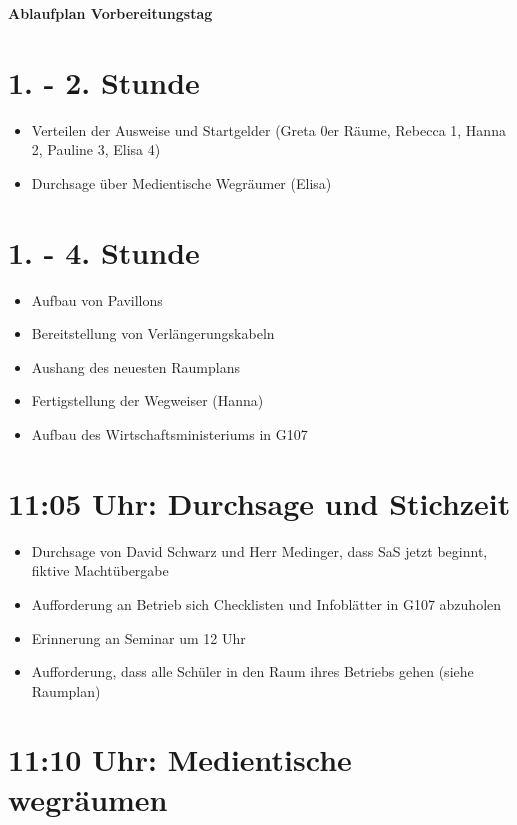 \documentclass[12pt]{article}
\begin{document}
\textbf{\LARGE{Ablaufplan Vorbereitungstag}}

\vspace{0.1cm}

\section*{1. - 2. Stunde}

\begin{itemize}
    \setlength{\itemsep}{0pt}
    \item Verteilen der Ausweise und Startgelder
        (Greta 0er Räume, Rebecca 1, Hanna 2, Pauline 3, Elisa 4)
    \item Durchsage über Medientische Wegräumer (Elisa)
\end{itemize}

\section*{1. - 4. Stunde}

\begin{itemize}
    \setlength{\itemsep}{0pt}
    \item Aufbau von Pavillons
    \item Bereitstellung von Verlängerungskabeln
    \item Aushang des neuesten Raumplans
    \item Fertigstellung der Wegweiser (Hanna)
    \item Aufbau des Wirtschaftsministeriums in G107
\end{itemize}

\section*{11:05 Uhr: Durchsage und Stichzeit}

\begin{itemize}
    \setlength{\itemsep}{0pt}
    \item Durchsage von David Schwarz und Herr Medinger, dass SaS jetzt beginnt, fiktive
        Machtübergabe
    \item Aufforderung an Betrieb sich Checklisten und Infoblätter in G107 abzuholen
    \item Erinnerung an Seminar um 12 Uhr
    \item Aufforderung, dass alle Schüler in den Raum ihres Betriebs gehen (siehe Raumplan)
\end{itemize}

\section*{11:10 Uhr: Medientische wegräumen}
\end{document}
